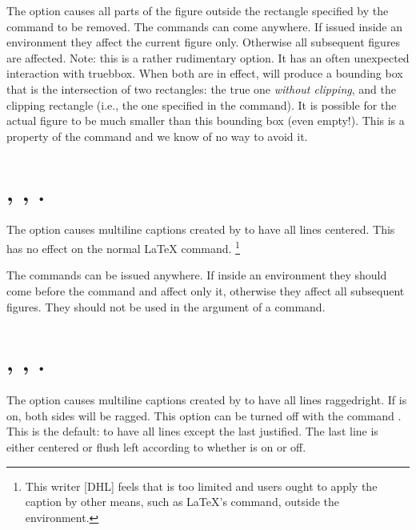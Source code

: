 \documentclass[letterpaper]{article}
\begin{document}
The  option causes all parts of the figure outside the
rectangle specified by the  command to be removed. The
commands can come anywhere. If issued inside an  environment
they affect the current figure only. Otherwise all subsequent figures
are affected. Note: this is a rather rudimentary option. It has an often
unexpected interaction with truebbox. When both are in effect, \MP{}
will produce a bounding box that is the intersection of two rectangles:
the true one \emph{without clipping}, and the clipping rectangle (i.e.,
the one specified in the  command). It is possible for the
actual figure to be much smaller than this bounding box (even empty!).
This is a property of the \MP{}  command and we know of no way
to avoid it.


\section{, ,
.}\label{centeredcaptions}
%
%

The  option causes multiline captions created by
 to have all lines centered. This has no effect on the
normal \LaTeX{}  command.%
    \footnote{This writer [DHL] feels that  is too limited
    and users ought to apply the caption by other means, such as
    \LaTeX{}'s  command, outside the 
    environment.}%

The commands can be issued anywhere. If inside an 
environment they should come before the  command and affect
only it, otherwise they affect all subsequent figures. They should not
be used in the argument of a  command.


\section{, ,
.}\label{raggedcaptions}
%
%

The  option causes multiline captions created by
 to have all lines ragged\-right. If 
is on, both sides will be ragged. This option can be turned off with the
command . This is the default: to have all lines
except the last justified. The last line is either centered or flush
left according to whether  is on or off.
\end{document}
